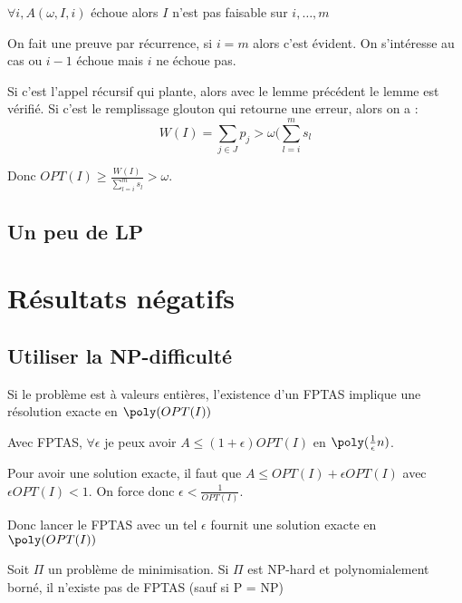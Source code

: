\documentclass[a4paper, 11pt]{thesis}
\begin{document}

\begin{lemma}
    $\forall i, A(\omega, I, i)$ échoue alors $I$ n'est pas faisable sur $i, \dots, m$
\end{lemma}

On fait une preuve par récurrence, si $i = m$ alors c'est évident. On s'intéresse au cas ou $i-1$
échoue mais $i$ ne échoue pas.

Si c'est l'appel récursif qui plante, alors avec le lemme précédent le lemme est vérifié. Si c'est
le remplissage glouton qui retourne une erreur, alors on a : \begin{displaymath}
    W(I) = \sum_{j \in J} p_j > \omega (\sum_{l=i}^m s_l
\end{displaymath}

Donc $OPT(I) \geq \frac{W(I)}{\sum_{l=i}^m s_l} > \omega$.



\section{Un peu de LP}
\chapter{Résultats négatifs}

\section{Utiliser la NP-difficulté}

\begin{lemma}
    Si le problème est à valeurs entières, l'existence d'un FPTAS implique une résolution exacte en
    $\poly(OPT(I))$
\end{lemma}

Avec FPTAS, $\forall \epsilon$ je peux avoir $A \leq (1 + \epsilon) OPT(I)$ en
$\poly(\frac{1}{\epsilon} n)$.

Pour avoir une solution exacte, il faut que $A \leq OPT(I) + \epsilon OPT(I)$ avec $\epsilon OPT(I)
< 1$. On force donc $\epsilon < \frac{1}{OPT(I)}$.

Donc lancer le FPTAS avec un tel $\epsilon$ fournit une solution exacte en $\poly(OPT(I))$

\begin{corol}
    Soit $\Pi$ un problème de minimisation. Si $\Pi$ est NP-hard et polynomialement borné, il n'existe pas de
    FPTAS (sauf si P = NP)
\end{corol}
\end{document}
